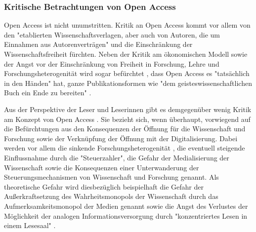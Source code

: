 \subsubsection{Kritische Betrachtungen von Open Access}

Open Access ist nicht unumstritten. Kritik an Open Access kommt vor allem von den "etablierten Wissenschaftsverlagen, aber auch von Autoren, die um Einnahmen aus Autorenverträgen" \cite[:24]{Schirmbacher_2007} und die Einschränkung der Wissenschaftsfreiheit fürchten. Neben der Kritik am ökonomischen Modell sowie der Angst vor der Einschränkung von Freiheit in Forschung, Lehre und Forschungsheterogenität wird sogar befürchtet \cite{Szczesny_2014}, dass Open Access es "tatsächlich in den Händen" hat, ganze Publikationsformen wie "dem geisteswissenschaftlichen Buch ein Ende zu bereiten" \cite[:6]{Hirschi_2015}.

Aus der Perspektive der Leser und Leserinnen gibt es demgegenüber wenig Kritik am Konzept von Open Access \cite[:287]{Wein_2010} \cite{Weishaupt_2009}. Sie bezieht sich, wenn überhaupt, vorwiegend auf die Befürchtungen aus den Konsequenzen der Öffnung für die Wissenschaft und Forschung sowie der Verknüpfung der Öffnung mit der Digitalisierung. Dabei werden vor allem die sinkende Forschungsheterogenität \cite{Hirschi_2015}, die eventuell steigende Einflussnahme durch die "Steuerzahler", die Gefahr der Medialisierung der Wissenschaft \cite{Weingart_2005} sowie die Konsequenzen einer Unterwanderung der Steuerungsmechanismen von Wissenschaft und Forschung genannt. Als theoretische Gefahr wird diesbezüglich beispielhaft die Gefahr der Außerkraftsetzung des Wahrheitsmonopols der Wissenschaft durch das Aufmerksamkeitsmonopol der Medien genannt \cite{Weingart_2005} sowie die Angst des Verlustes der Möglichkeit der analogen Informationsversorgung durch "konzentriertes Lesen in einem Lesesaal" \cite[:4]{Winkler_2011}.

